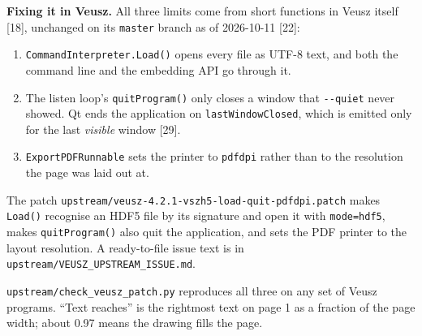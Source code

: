 \documentclass[
\directlua{luaotfload.add_fallback("qsfallback", {"DejaVu Sans:mode=harf;", "DejaVu Sans Mono:mode=harf;", "DejaVu Math TeX Gyre:mode=harf;"})}
  10pt,
  letterpaper,
]{article}
\providecommand{\tightlist}{%
  \setlength{\itemsep}{0pt}\setlength{\parskip}{0pt}}
\begin{document}
\textbf{Fixing it in Veusz.} All three limits come from short functions
in Veusz itself {[}18{]}, unchanged on its \texttt{master} branch as of
2026-10-11 {[}22{]}:

\begin{enumerate}
\def\labelenumi{\arabic{enumi}.}
\tightlist
\item
  \texttt{CommandInterpreter.Load()} opens every file as UTF-8 text, and
  both the command line and the embedding API go through it.
\item
  The listen loop's \texttt{quitProgram()} only closes a window that
  \texttt{-\/-quiet} never showed. Qt ends the application on
  \texttt{lastWindowClosed}, which is emitted only for the last
  \emph{visible} window {[}29{]}.
\item
  \texttt{ExportPDFRunnable} sets the printer to \texttt{pdfdpi} rather
  than to the resolution the page was laid out at.
\end{enumerate}

The patch \texttt{upstream/veusz-4.2.1-vszh5-load-quit-pdfdpi.patch}
makes \texttt{Load()} recognise an HDF5 file by its signature and open
it with \texttt{mode=\textquotesingle{}hdf5\textquotesingle{}}, makes
\texttt{quitProgram()} also quit the application, and sets the PDF
printer to the layout resolution. A ready-to-file issue text is in
\texttt{upstream/VEUSZ\_UPSTREAM\_ISSUE.md}.

\texttt{upstream/check\_veusz\_patch.py} reproduces all three on any set
of Veusz programs. ``Text reaches'' is the rightmost text on page 1 as a
fraction of the page width; about 0.97 means the drawing fills the page.
\end{document}
